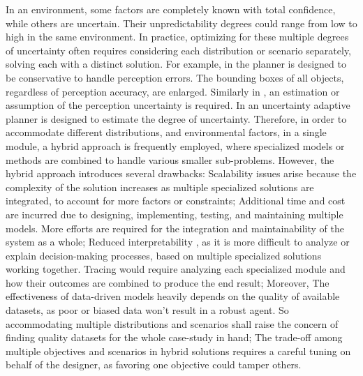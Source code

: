 \documentclass[pdflatex,sn-mathphys-num]{sn-jnl}%
\begin{document}
In an environment, some factors are completely known with total confidence, while others are uncertain. Their unpredictability degrees could range from low to high in the same environment. In practice, optimizing for these multiple degrees of uncertainty often requires considering each distribution or scenario separately, solving each with a distinct solution. For example, in \cite{OnboardMitigation_2} the planner is designed to be conservative to handle perception errors. The bounding boxes of all objects, regardless of perception accuracy, are enlarged. Similarly in \cite{OnboardMitigation_3}, an estimation or assumption of the perception uncertainty is required. In \cite{OnboardMitigation_4} an uncertainty adaptive planner is designed to estimate the degree of uncertainty. Therefore, in order to accommodate different distributions, and environmental factors, in a single module, a hybrid approach is frequently employed, where specialized models or methods are combined to handle various smaller sub-problems. However, the hybrid approach introduces several drawbacks: Scalability issues arise \cite{scalabilityML} because the complexity of the solution increases as multiple specialized solutions are integrated, to account for more factors or constraints; Additional time and cost are incurred due to designing, implementing, testing, and maintaining multiple models. More efforts are required for the integration and maintainability of the system as a whole; Reduced interpretability \cite{UncertainSurvey}, as it is more difficult to analyze or explain decision-making processes, based on multiple specialized solutions working together. Tracing would require analyzing each specialized module and how their outcomes are combined to produce the end result; Moreover, The effectiveness of data-driven models heavily depends on the quality of available datasets, as poor or biased data won't result in a robust agent. So accommodating multiple distributions and scenarios shall raise the concern of finding quality datasets for the whole case-study in hand; The trade-off among multiple objectives and scenarios in hybrid solutions requires a careful tuning on behalf of the designer, as favoring one objective could tamper others.
\end{document}
